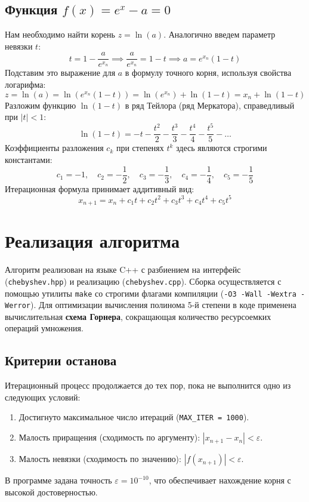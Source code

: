 \documentclass[12pt, a4paper]{article}
\theoremstyle{definition}
\begin{document}
\subsection{Функция $f(x) = e^x - a = 0$}
Нам необходимо найти корень $z = \ln(a)$. 
Аналогично введем параметр невязки $t$:
\[
t = 1 - \frac{a}{e^{x_n}} \implies \frac{a}{e^{x_n}} = 1 - t \implies a = e^{x_n}(1 - t)
\]
Подставим это выражение для $a$ в формулу точного корня, используя свойства логарифма:
\[
z = \ln(a) = \ln(e^{x_n}(1 - t)) = \ln(e^{x_n}) + \ln(1 - t) = x_n + \ln(1 - t)
\]
Разложим функцию $\ln(1 - t)$ в ряд Тейлора (ряд Меркатора), справедливый при $|t| < 1$:
\[
\ln(1 - t) = -t - \frac{t^2}{2} - \frac{t^3}{3} - \frac{t^4}{4} - \frac{t^5}{5} - \dots
\]
Коэффициенты разложения $c_k$ при степенях $t^k$ здесь являются строгими константами:
\[
c_1 = -1, \quad c_2 = -\frac{1}{2}, \quad c_3 = -\frac{1}{3}, \quad c_4 = -\frac{1}{4}, \quad c_5 = -\frac{1}{5}
\]
Итерационная формула принимает аддитивный вид:
\[
x_{n+1} = x_n + c_1 t + c_2 t^2 + c_3 t^3 + c_4 t^4 + c_5 t^5
\]

\section{Реализация алгоритма}
Алгоритм реализован на языке C++ с разбиением на интерфейс (\texttt{chebyshev.hpp}) и реализацию (\texttt{chebyshev.cpp}). Сборка осуществляется с помощью утилиты \texttt{make} со строгими флагами компиляции (\texttt{-O3 -Wall -Wextra -Werror}). Для оптимизации вычисления полинома 5-й степени в коде применена вычислительная \textbf{схема Горнера}, сокращающая количество ресурсоемких операций умножения.

\subsection{Критерии останова}
Итерационный процесс продолжается до тех пор, пока не выполнится одно из следующих условий:
\begin{enumerate}
    \item Достигнуто максимальное число итераций (\texttt{MAX\_ITER = 1000}).
    \item Малость приращения (сходимость по аргументу): $|x_{n+1} - x_n| < \varepsilon$.
    \item Малость невязки (сходимость по значению): $|f(x_{n+1})| < \varepsilon$.
\end{enumerate}
В программе задана точность $\varepsilon = 10^{-10}$, что обеспечивает нахождение корня с высокой достоверностью.
\end{document}
